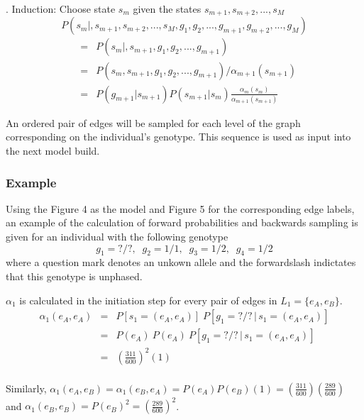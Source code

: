 \documentclass[a4paper,11pt,twoside,abstraction,titlepage]{article}
\begin{document}
\vspace{10pt}
. Induction: Choose state $s_m$ given the states $s_{m+1},s_{m+2},...,s_M$
\begin{equation*}
P(s_m|,s_{m+1},s_{m+2},...,s_M,g_1,g_2,...,g_{m+1},g_{m+2},...,g_M)
\end{equation*} \vspace{-25pt}
\begin{eqnarray*}
&=&  P(s_m|,s_{m+1},g_1,g_2,...,g_{m+1}) \\
&=& P(s_m,s_{m+1},g_1,g_2,...,g_{m+1})/\alpha_{m+1}(s_{m+1}) \\
&=& P(g_{m+1}|s_{m+1}) P(s_{m+1}|s_m) \frac{\alpha_m(s_m)}{\alpha_{m+1}(s_{m+1})}
\end{eqnarray*}

\noindent An ordered pair of edges will be sampled for each level of the graph corresponding on the individual's genotype.  This sequence is used as input into the next model build. \cite{beagle2}


\subsubsection{Example}
Using the Figure 4 as the model and Figure 5 for the corresponding edge labels, an example of the calculation of forward probabilities and backwards sampling is given for an individual with the following genotype
\begin{equation*}
g_1 = ?/?, \;\; g_2 = 1/1, \;\; g_3 = 1/2, \;\; g_4 = 1/2
\end{equation*}
where a question mark denotes an unkown allele and the forwardslash indictates that this genotype is unphased.
\vspace{10pt}

\noindent $\alpha_1$ is calculated in the initiation step for every pair of edges in $L_1 = \{e_{A}, e_{B}\}$.
\begin{eqnarray*}
\alpha_1(e_A,e_A) &=& P[s_1 = (e_A, e_A)] \; P[g_1=?/? \, | \, s_1 = (e_A,e_A)] \\
&=& P(e_A) \: P(e_A) \: P[g_1=?/? \, | \, s_1 = (e_A,e_A)] \\
&=& \left(\frac{311}{600}\right)^2\!\!(1)  \\
\end{eqnarray*}
\vspace{-20pt}

\noindent Similarly, $\alpha_1(e_A,e_B)  = \alpha_1(e_B,e_A)  = P(e_A)P(e_B)(1) = \left(\frac{311}{600}\right)\!\left(\frac{289}{600}\right)$ 
and $\alpha_1(e_B,e_B) = P(e_B)^2 = \left(\frac{289}{600}\right)^2$.
\end{document}

